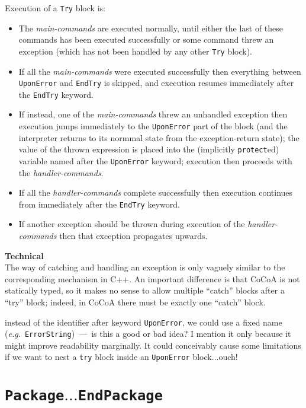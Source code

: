\documentclass{book}[12,a4paper]
\def\eg{{\it e.g.}}
\def\mydots{$...$}
\begin{document}
Execution of a \texttt{Try} block is:
\begin{itemize}
\item The \textit{main-commands} are executed normally, until either
  the last of these commands has been executed successfully or some
  command threw an exception (which has not been handled by any other
  \texttt{Try} block).
\item If all the \textit{main-commands} were executed successfully
  then everything between \texttt{UponError} and \texttt{EndTry} is
  skipped, and execution resumes immediately after the \texttt{EndTry}
  keyword.
\item If instead, one of the \textit{main-commands} threw an unhandled
  exception then execution jumps immediately to the \texttt{UponError}
  part of the block (and the interpreter returns to its normmal state
  from the exception-return state); the value of the thrown expression
  is placed into the (implicitly \texttt{protect}ed) variable named
  after the \texttt{UponError} keyword; execution then proceeds with
  the \textit{handler-commands}.
\item If all the \textit{handler-commands} complete successfully then
  execution continues from immediately after the \texttt{EndTry}
  keyword.
\item If another exception should be thrown during execution of the
  \textit{handler-commands} then that exception propagates upwards.
\end{itemize}


\textbf{Technical}\\
The way of catching and handling an exception is only vaguely similar
to the corresponding mechanism in C++.  An important difference is
that CoCoA is not statically typed, so it makes no sense to allow
multiple ``catch'' blocks after a ``try'' block; indeed, in CoCoA
there must be exactly one ``catch'' block.

 instead of the identifier after keyword \texttt{UponError},
we could use a fixed name (\eg~\texttt{ErrorString})~---~is this a good
or bad idea?  I mention it only because it might improve readability
marginally.  It could conceivably cause some limitations if we want to
nest a \texttt{try} block inside an \texttt{UponError} block\mydots ouch!

\section{\texttt{Package\mydots EndPackage}}
\label{command:package}
\end{document}
